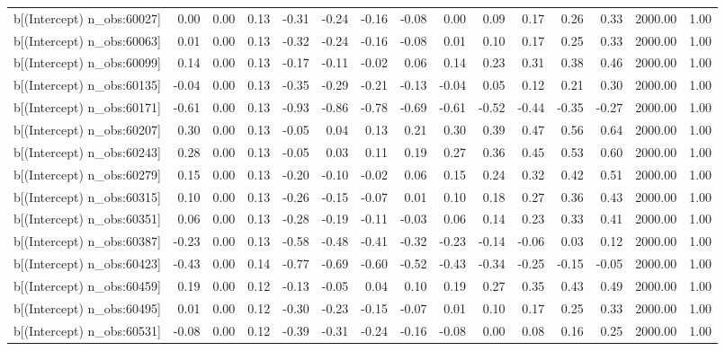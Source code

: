 \begin{table}[ht]
\begin{tabular}{rrrrrrrrrrrrrrr}
  b[(Intercept) n\_obs:60027] & 0.00 & 0.00 & 0.13 & -0.31 & -0.24 & -0.16 & -0.08 & 0.00 & 0.09 & 0.17 & 0.26 & 0.33 & 2000.00 & 1.00 \\ 
  b[(Intercept) n\_obs:60063] & 0.01 & 0.00 & 0.13 & -0.32 & -0.24 & -0.16 & -0.08 & 0.01 & 0.10 & 0.17 & 0.25 & 0.33 & 2000.00 & 1.00 \\ 
  b[(Intercept) n\_obs:60099] & 0.14 & 0.00 & 0.13 & -0.17 & -0.11 & -0.02 & 0.06 & 0.14 & 0.23 & 0.31 & 0.38 & 0.46 & 2000.00 & 1.00 \\ 
  b[(Intercept) n\_obs:60135] & -0.04 & 0.00 & 0.13 & -0.35 & -0.29 & -0.21 & -0.13 & -0.04 & 0.05 & 0.12 & 0.21 & 0.30 & 2000.00 & 1.00 \\ 
  b[(Intercept) n\_obs:60171] & -0.61 & 0.00 & 0.13 & -0.93 & -0.86 & -0.78 & -0.69 & -0.61 & -0.52 & -0.44 & -0.35 & -0.27 & 2000.00 & 1.00 \\ 
  b[(Intercept) n\_obs:60207] & 0.30 & 0.00 & 0.13 & -0.05 & 0.04 & 0.13 & 0.21 & 0.30 & 0.39 & 0.47 & 0.56 & 0.64 & 2000.00 & 1.00 \\ 
  b[(Intercept) n\_obs:60243] & 0.28 & 0.00 & 0.13 & -0.05 & 0.03 & 0.11 & 0.19 & 0.27 & 0.36 & 0.45 & 0.53 & 0.60 & 2000.00 & 1.00 \\ 
  b[(Intercept) n\_obs:60279] & 0.15 & 0.00 & 0.13 & -0.20 & -0.10 & -0.02 & 0.06 & 0.15 & 0.24 & 0.32 & 0.42 & 0.51 & 2000.00 & 1.00 \\ 
  b[(Intercept) n\_obs:60315] & 0.10 & 0.00 & 0.13 & -0.26 & -0.15 & -0.07 & 0.01 & 0.10 & 0.18 & 0.27 & 0.36 & 0.43 & 2000.00 & 1.00 \\ 
  b[(Intercept) n\_obs:60351] & 0.06 & 0.00 & 0.13 & -0.28 & -0.19 & -0.11 & -0.03 & 0.06 & 0.14 & 0.23 & 0.33 & 0.41 & 2000.00 & 1.00 \\ 
  b[(Intercept) n\_obs:60387] & -0.23 & 0.00 & 0.13 & -0.58 & -0.48 & -0.41 & -0.32 & -0.23 & -0.14 & -0.06 & 0.03 & 0.12 & 2000.00 & 1.00 \\ 
  b[(Intercept) n\_obs:60423] & -0.43 & 0.00 & 0.14 & -0.77 & -0.69 & -0.60 & -0.52 & -0.43 & -0.34 & -0.25 & -0.15 & -0.05 & 2000.00 & 1.00 \\ 
  b[(Intercept) n\_obs:60459] & 0.19 & 0.00 & 0.12 & -0.13 & -0.05 & 0.04 & 0.10 & 0.19 & 0.27 & 0.35 & 0.43 & 0.49 & 2000.00 & 1.00 \\ 
  b[(Intercept) n\_obs:60495] & 0.01 & 0.00 & 0.12 & -0.30 & -0.23 & -0.15 & -0.07 & 0.01 & 0.10 & 0.17 & 0.25 & 0.33 & 2000.00 & 1.00 \\ 
  b[(Intercept) n\_obs:60531] & -0.08 & 0.00 & 0.12 & -0.39 & -0.31 & -0.24 & -0.16 & -0.08 & 0.00 & 0.08 & 0.16 & 0.25 & 2000.00 & 1.00 \\ 

\end{tabular}
\end{table}
